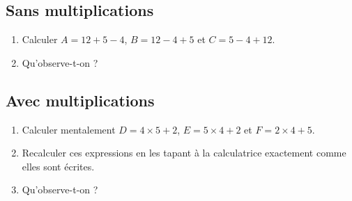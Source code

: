 
\subsection*{Sans multiplications}

\begin{enumerate}
    \item
        
Calculer \( A=12+5-4\), \( B=12-4+5\) et \( C=5-4+12\).
\item
    Qu'observe-t-on ?
\end{enumerate}

\subsection*{Avec multiplications}

\begin{enumerate}
    \item
        Calculer mentalement \( D=4\times 5+2\), \( E=5\times 4+2\) et \( F=2\times 4+5\).
    \item
        Recalculer ces expressions en les tapant à la calculatrice exactement comme elles sont écrites.
    \item
        Qu'observe-t-on ?
\end{enumerate}
